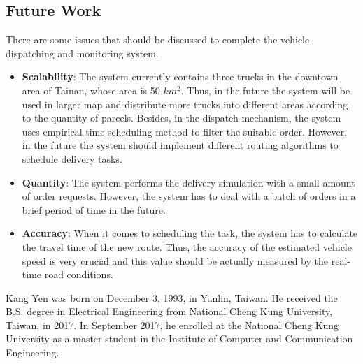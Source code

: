 \documentclass[12pt]{ksthesis}
\begin{document}
\begin{thesis}
{\section{Future Work}

There are some issues that should be discussed to complete the vehicle dispatching and monitoring system.

\begin{itemize}


\item
\textbf{Scalability}: The system currently contains three trucks in the downtown area of Tainan, whose area is 50 $km^{2}$. Thus, in the future the system will be used in larger map and distribute more trucks into different areas according to the quantity of parcels. Besides, in the dispatch mechanism, the system uses empirical time scheduling method to filter the suitable order. However, in the future the system should implement different routing algorithms to schedule delivery tasks.

\item
\textbf{Quantity}: The system performs the delivery simulation with a small amount of order requests. However, the system has to deal with a batch of orders in a brief period of time in the future.

\item
\textbf{Accuracy}: When it comes to scheduling the task, the system has to calculate the travel time of the new route. Thus, the accuracy of the estimated vehicle speed is very crucial and this value should be actually measured by the real-time road conditions.

\end{itemize}


} \end{thesis}

\singlespace {\large



}



\doublespace

\begin{vita}
\Thesisspace \large{

Kang Yen was born on December 3, 1993, in Yunlin, Taiwan. He received the B.S. degree in Electrical Engineering from National Cheng Kung University, Taiwan, in 2017. In September 2017, he enrolled at the National Cheng Kung University as a master student in the Institute of Computer and Communication Engineering.

}\end{vita}
\end{document}
